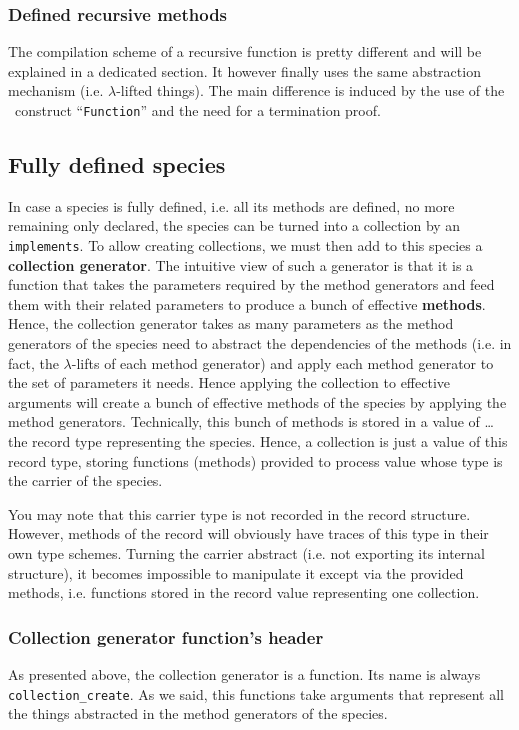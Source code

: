 \subsubsection{Defined recursive methods}
The compilation scheme of a recursive function is pretty different and
will be explained in a dedicated section. It however finally uses the
same abstraction mechanism (i.e. $\lambda$-lifted things). The main
difference is induced by the use of the \coq\ construct
``{\tt Function}'' and the need for a termination proof.



\subsection{Fully defined species}
In case a species is fully defined, i.e. all its methods are defined,
no more remaining only declared, the species can be turned into a
collection by an {\tt implements}. To allow creating collections, we
must then add to this species a {\bf collection generator}. The
intuitive view of such a generator is that it is a function that takes
the parameters required by the method generators and feed them with
their related parameters to produce a bunch of effective {\bf methods}.
Hence, the collection generator takes as many parameters as the method
generators of the species need to abstract the dependencies of the
methods (i.e. in fact, the $\lambda$-lifts of each method generator)
and apply each method generator to the set of parameters it needs.
Hence applying the collection to effective arguments will create a
bunch of effective methods of the species by applying the method
generators. Technically, this bunch of methods is stored in a value of
\ldots the record type representing the species. Hence, a collection
is just a value of this record type, storing functions (methods)
provided to process value whose type is the carrier of the species.

You may note that this carrier type is not recorded in the record
structure. However, methods of the record will obviously have traces
of this type in their own type schemes. Turning the carrier abstract
(i.e. not exporting its internal structure), it becomes impossible to
manipulate it except via the provided methods, i.e. functions stored
in the record value representing one collection.


\subsubsection{Collection generator function's header}
As presented above, the collection generator is a function. Its name
is always {\tt collection\_create}. As we said, this functions take
arguments that represent all the things abstracted in the method
generators of the species.

